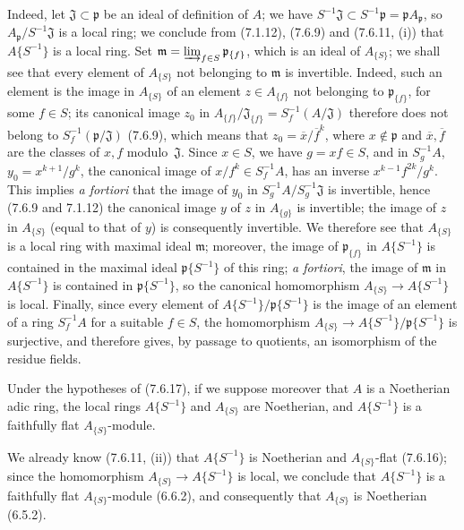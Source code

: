 Indeed, let $\mathfrak J\subset\mathfrak p$ be an ideal of definition of
$A$; we have $S^{-1}\mathfrak J\subset S^{-1}\mathfrak p=\mathfrak p
A_{\mathfrak p}$, so $A_{\mathfrak p}/S^{-1}\mathfrak J$ is a local
ring; we conclude from (7.1.12), (7.6.9) and (7.6.11, (i)) that
$A\{S^{-1}\}$ is a local ring. Set
$\mathfrak m=\varinjlim_{f\in S}\mathfrak p_{\{f\}}$, which is an ideal of
$A_{\{S\}}$; we shall see that every element of $A_{\{S\}}$ not belonging
to $\mathfrak m$ is invertible. Indeed, such an element is the image in
$A_{\{S\}}$ of an element $z\in A_{\{f\}}$ not belonging to
$\mathfrak p_{\{f\}}$, for some $f\in S$; its canonical image $z_0$ in
$A_{\{f\}}/\mathfrak J_{\{f\}}=S_f^{-1}(A/\mathfrak J)$ therefore does not belong
to $S_f^{-1}(\mathfrak p/\mathfrak J)$ (7.6.9), which means that
$z_0=\overline{x}/\overline{f}^k$, where $x\notin\mathfrak p$ and
$\overline{x},\overline{f}$ are the classes of $x,f$ modulo~$\mathfrak J$.
Since $x\in S$, we have $g=xf\in S$, and in $S_g^{-1}A$,
$y_0=x^{k+1}/g^k$, the canonical image of $x/f^k\in S_f^{-1}A$, has an
inverse $x^{k-1}f^{2k}/g^k$. This implies \emph{a fortiori} that the image of
$y_0$ in $S_g^{-1}A/S_g^{-1}\mathfrak J$ is invertible, hence (7.6.9 and
7.1.12) the canonical image $y$ of $z$ in $A_{\{g\}}$ is invertible;
the image of $z$ in $A_{\{S\}}$ (equal to that of $y$) is consequently
invertible. We therefore see that $A_{\{S\}}$ is a local ring with maximal ideal
$\mathfrak m$; moreover, the image of $\mathfrak p_{\{f\}}$ in
$A\{S^{-1}\}$ is contained in the maximal ideal $\mathfrak p\{S^{-1}\}$ of
this ring; \emph{a fortiori}, the image of $\mathfrak m$ in
$A\{S^{-1}\}$ is contained in $\mathfrak p\{S^{-1}\}$, so
the canonical homomorphism $A_{\{S\}}\to A\{S^{-1}\}$ is local. Finally,
since every element of $A\{S^{-1}\}/\mathfrak p\{S^{-1}\}$ is the image of an
element of a ring $S_f^{-1}A$ for a suitable $f\in S$,
the homomorphism $A_{\{S\}}\to A\{S^{-1}\}/\mathfrak p\{S^{-1}\}$ is
surjective, and therefore gives, by passage to quotients, an isomorphism of the residue
fields.

\begin{corollary}[7.6.18]
\label{0.7.6.18}
Under the hypotheses of (7.6.17), if we suppose moreover that $A$ is a Noetherian
adic ring, the local rings $A\{S^{-1}\}$ and $A_{\{S\}}$ are
Noetherian, and $A\{S^{-1}\}$ is a faithfully flat $A_{\{S\}}$-module.
\end{corollary}

We already know (7.6.11, (ii)) that $A\{S^{-1}\}$ is Noetherian and
$A_{\{S\}}$-flat (7.6.16); since the homomorphism
$A_{\{S\}}\to A\{S^{-1}\}$ is local, we conclude that $A\{S^{-1}\}$ is
a faithfully flat $A_{\{S\}}$-module (6.6.2), and consequently that $A_{\{S\}}$
is Noetherian (6.5.2).

